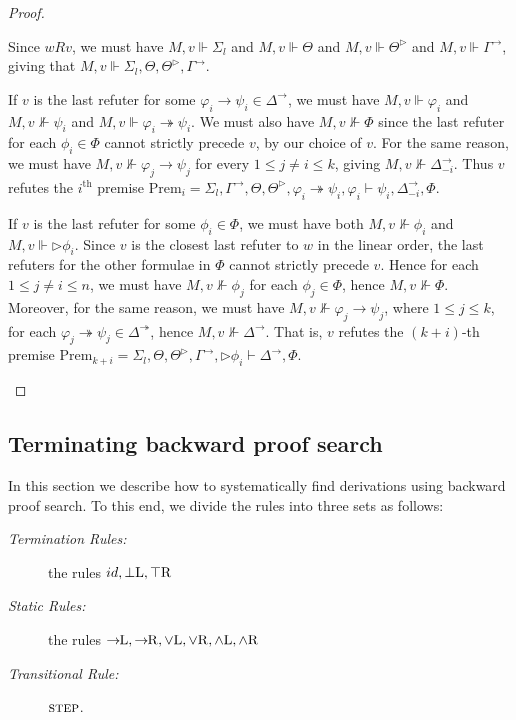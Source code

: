 \documentclass[envcountsect,envcountsame]{llncs}
\newcommand{\forces}{\Vdash}
\newcommand{\iimp}{\twoheadrightarrow}
\newcommand{\limp}{\rightarrow}
\newcommand{\nxt}{\rhd}
\newcommand{\opset}[2]{{#2}^{#1}}
\newcommand{\opsetmi}[3]{\opset{#1}{#2}_{-#3}}
\newcommand{\rel}{R}
\newcommand{\seq}{\vdash}
\newcommand{\toprightrulename}{\small \top \mathrm{R}}
\newcommand{\idrulename}{\small id}
\newcommand{\botleftrulename}{\small \bot \mathrm{L}}
\newcommand{\orleftrulename}{\small \lor \mathrm{L}}
\newcommand{\orrightrulename}{\small \lor \mathrm{R}}
\newcommand{\andrightrulename}{\small \land \mathrm{R}}
\newcommand{\andleftrulename}{\small \land \mathrm{L}}
\newcommand{\impleftrulename}{\small \limp\!\!\mathrm{L}}
\newcommand{\imprightrulename}{\small \limp\!\!\mathrm{R}}
\newcommand{\steprulename}{\textsc{step}}
\begin{document}
\begin{proof}
\begin{description}
    Since $w \rel v$, we must have
    $M, v \forces \Sigma_l$ and
    $M, v \forces \Theta$ and
    $M, v \forces \opset{\nxt}{\Theta}$ and
    $M, v \forces \opset{\limp}{\Gamma}$, giving that
    $M, v \forces \Sigma_l, \Theta, \opset{\nxt}{\Theta}, \opset{\limp}{\Gamma}$.

    If $v$ is the last refuter for
    some 
    $\varphi_i \limp \psi_i \in \opset{\limp}{\Delta}$,
    we must have 
$M, v \forces \varphi_i$ and
    $M, v \not\forces \psi_i$ and
    $M, v \forces \varphi_i\iimp\psi_i$. 
    We must also have 
    $M, v \not\forces \Phi$ since the last refuter for each
    $\phi_i \in \Phi$ cannot strictly precede $v$,
    by our choice of $v$.
    For the same reason, we must have
    $M, v \not\forces \varphi_j\limp\psi_j$ for every
    $1 \leq j \neq i \leq k$, giving
    $M, v \not\forces\opsetmi{\limp}{\Delta}{i}$.
    Thus $v$ refutes the 
    $i^\mathrm{th}$ premise 
    $\mathrm{Prem}_i = 
     \Sigma_l, \opset{\limp}{\Gamma}, \Theta, \opset{\nxt}{\Theta},
     \varphi_i\iimp\psi_i , \varphi_i \seq \psi_i, 
     \opsetmi{\limp}{\Delta}{i}, \Phi
    $.

    If $v$ is the last refuter for
    some
    $\phi_i \in \Phi$,
    we must have both
    $M, v \not\forces \phi_i$ and
    $M, v \forces \nxt\phi_i$.
    Since
    $v$ is the closest last refuter to $w$ in the linear order,
    the last refuters for the other formulae in $\Phi$ cannot strictly
    precede $v$.
    Hence for each $1 \leq j \neq i \leq n$,
    we must have
    $M, v \not\forces \phi_j$
    for each 
    $\phi_j \in \Phi$, hence
    $M, v \not\forces \Phi$.
    Moreover, for the same reason,
    we must have
    $M, v \not\forces \varphi_j \limp \psi_j$,
    where $1 \leq j \leq k$,
    for each 
    $\varphi_j\iimp\psi_j \in \opset{\iimp}{\Delta}$, hence
    $M, v \not\forces \opset{\limp}{\Delta}$.
    That is, $v$ refutes the
    $(k+i)$-th premise
    $\mathrm{Prem}_{k+i} = \Sigma_l, \Theta, 
     \opset{\nxt}{\Theta}, \opset{\limp}{\Gamma},
     \nxt \phi_i \seq \opset{\limp}{\Delta},
     \Phi$.
   \end{description}
\end{proof}


\subsection{Terminating backward proof search}\label{Sec:Proof_Search}

In this section we describe how to systematically find derivations using backward proof
search. To this end, we divide the rules into three sets as follows:
\begin{description}
\item[\rm \emph{Termination Rules:}] the rules 
$\idrulename,
\botleftrulename,
\toprightrulename$ 
\item[\rm \emph{Static Rules:}] the rules
      $\impleftrulename,
      \imprightrulename,
      \orleftrulename,
      \orrightrulename,
      \andleftrulename,
      \andrightrulename$
\item[\rm \emph{Transitional Rule:}] $\steprulename$.
\end{description}
\end{document}
